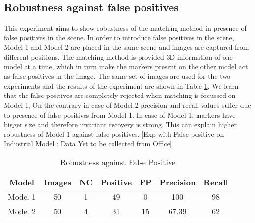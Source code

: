 \documentclass{bmvc2k}
\begin{document}
\subsection{Robustness against false positives}
This experiment aims to show robustness of the matching method in presence of false positives in the scene. 
In order to introduce false positives in the scene, Model 1 and Model 2 are placed in the same scene and images are captured from different positions. 
The matching method is provided 3D information of one model at a time, which in turn make the markers present on the other model act as false positives in the image. 
The same set of images are used for the two experiments and the results of the experiment are shown in Table \ref{tab:Exp3}.
We learn that the false positives are completely rejected when matching is focussed on Model 1, On the contrary in case of Model 2 precision and recall values suffer due to presence of false positives from Model 1. 
In case of Model 1, markers have bigger size and therefore invariant recovery is strong. This can explain higher robustness of Model 1 against false positives. 
[Exp with False positive on Industrial Model : Data Yet to be collected from Office]
\begin{table}[h]
\centering
\caption{Robustness against False Positive } 
\begin{tabular}{ | c | c | c | c | c | c | c |}
\hline
Model & Images & NC & Positive & FP & Precision & Recall \\ \hline
Model 1 & 50 & 1  & 49 & 0  & 100 & 98 \\
Model 2 & 50 & 4 & 31 & 15  & 67.39 & 62 \\ \hline
\end{tabular} \\
\label{tab:Exp3}
\end{table}
\end{document}

